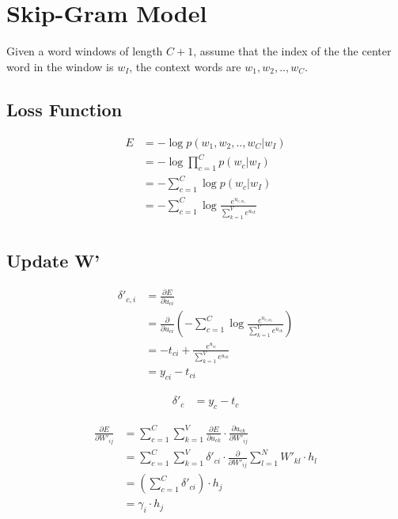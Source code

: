 \documentclass{article}
\begin{document}
	\section{Skip-Gram Model}
	Given a word windows of length $C+1$, assume that the index of the the center word in the window is $w_I$, the context words are $w_1, w_2, .., w_C$.
	\subsection{Loss Function}
	\begin{equation}
		\begin{aligned}
			E &=-\log p(w_{1}, w_{2}, .., w_{C}|w_{I})\\ 
			&= -\log \prod_{c=1}^{C} p(w_{c}|w_{I}) \\
			&= -\sum_{c=1}^{C} \log p(w_{c}|w_{I}) \\ 
			&= -\sum_{c=1}^{C} \log \frac{e^{u_{c,w_c}}}{\sum_{k=1}^{V}e^{u_{ck}}} \\ 
		\end{aligned}
	\end{equation}
	
	\subsection{Update W'}
	\begin{equation}
		\begin{aligned}
			\delta'_{c, i} &= \frac{\partial E}{\partial u_{ci}} \\
			&= \frac{\partial}{\partial u_{ci}} \left(
			-\sum_{c=1}^{C} \log \frac{e^{u_{c,w_c}}}{\sum_{k=1}^{V}e^{u_{ck}}} \right) \\
			&= -t_{ci} + \frac{e^{u_{ci}}}{\sum_{k=1}^{V}e^{u_{ck}}} \\
			&= y_{ci} - t_{ci}
		\end{aligned}
	\end{equation}
	
	\begin{equation}
		\begin{aligned}
			\delta'_{c} &= y_{c} - t_{c} 
		\end{aligned}
	\end{equation}

	\begin{equation}
		\begin{aligned}
			\frac{\partial E}{\partial W'_{ij}} &= \sum_{c=1}^{C} \sum_{k=1}^{V} \frac{\partial E}{\partial u_{ck}} \cdot \frac{\partial u_{ck}}{\partial W'_{ij}} \\
			&= \sum_{c=1}^{C} \sum_{k=1}^{V} \delta'_{ci} \cdot \frac{\partial}{\partial W'_{ij}}\sum_{l=1}^{N} W'_{kl} \cdot h_l \\
			&= \left(\sum_{c=1}^{C} \delta'_{ci} \right)\cdot h_j \\
			&= \gamma_i \cdot h_j
		\end{aligned}	
	\end{equation}
	
\end{document}
